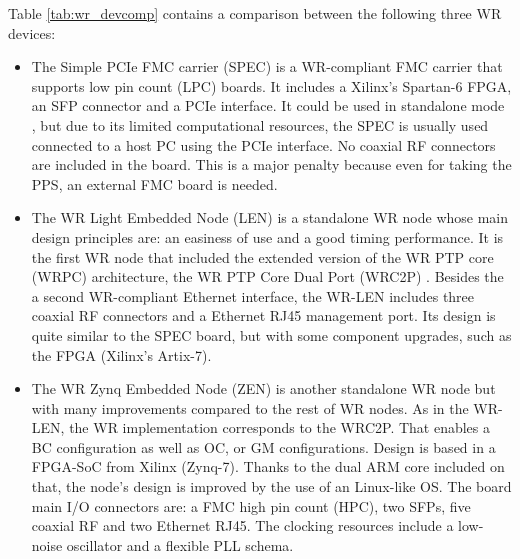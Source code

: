Table \ref{tab:wr_devcomp} contains a comparison between the following three WR 
devices: 
\begin{itemize}
	\item The Simple PCIe FMC carrier (SPEC) \cite{ohwr:spec} is a WR-compliant 
	FMC carrier that supports low pin count (LPC) boards. It includes a 
	Xilinx's Spartan-6 FPGA, an SFP connector and a PCIe interface. It could be 
	used in standalone mode \cite{migueljl-paper-wr-spec}, but due to its 
	limited computational resources, the SPEC is usually used connected to a 
	host PC using the PCIe interface. 
	No coaxial RF connectors are included in the board. This is a major penalty 
	because even for taking the PPS, an external FMC board is needed.
	
	\item The WR Light Embedded Node (LEN) \cite{sevensols:wr_len} is a 
	standalone WR node whose main design principles are: an easiness of use and 
	a good timing performance. It is the first WR node that included the 
	extended version of the WR PTP core (WRPC) architecture, the WR PTP Core 
	Dual Port (WRC2P) \cite{torres2016scalability}. Besides the a second 
	WR-compliant 
	Ethernet interface, the WR-LEN includes three coaxial RF connectors and a 
	Ethernet RJ45 management port. Its design is quite similar to the SPEC 
	board, but with some component upgrades, such as the FPGA (Xilinx's 
	Artix-7).
	
	\item The WR Zynq Embedded Node (ZEN) \cite{sevensols:wr_zen} is another 
	standalone WR node but with many improvements compared to the rest of WR 
	nodes. As in the WR-LEN, the WR implementation corresponds to the WRC2P. 
	That enables a BC configuration as well as OC, or GM configurations. Design 
	is based in a FPGA-SoC from Xilinx (Zynq-7). Thanks to the dual ARM core 
	included on that, the node's design is improved by the use of an Linux-like 
	OS. The board main I/O connectors are: a FMC high pin count (HPC), two 
	SFPs, five coaxial RF and two Ethernet RJ45. The clocking resources include 
	a low-noise oscillator and a flexible PLL schema.
\end{itemize}


